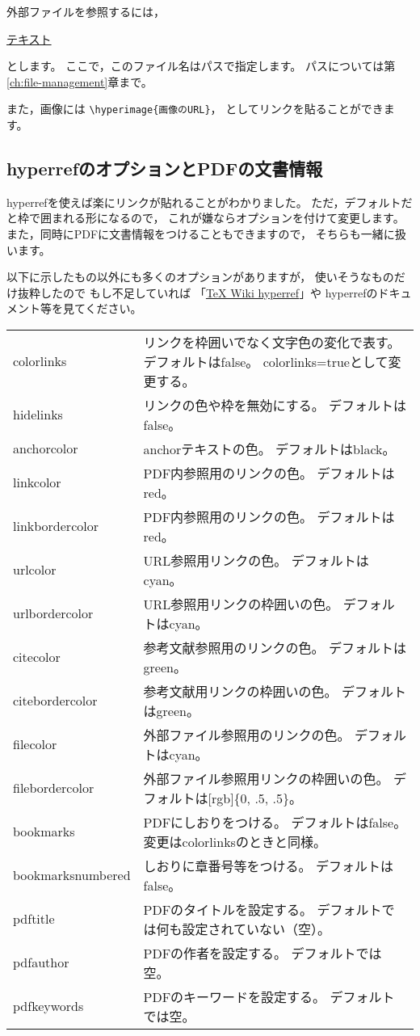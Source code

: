 外部ファイルを参照するには，
\begin{ITeX}
\href{ファイル名}{テキスト}
\end{ITeX}
とします。
ここで，このファイル名はパスで指定します。
パスについては第\ref{ch:file-management}章まで。

また，画像には
\verb|\hyperimage{画像のURL}|，
としてリンクを貼ることができます。


\subsection{hyperrefのオプションとPDFの文書情報}
hyperrefを使えば楽にリンクが貼れることがわかりました。
ただ，デフォルトだと枠で囲まれる形になるので，
これが嫌ならオプションを付けて変更します。
また，同時にPDFに文書情報をつけることもできますので，
そちらも一緒に扱います。

以下に示したもの以外にも多くのオプションがありますが，
使いそうなものだけ抜粋したので
もし不足していれば
「\href{https://texwiki.texjp.org/?hyperref}{TeX Wiki hyperref}」や
hyperrefのドキュメント等を見てください。

\begin{table}[H]
\label{tab:options-of-hyperef}
\begin{center}
\begin{longtable}{lp{}}
colorlinks &
	リンクを枠囲いでなく文字色の変化で表す。
	デフォルトはfalse。
	colorlinks=trueとして変更する。\\
hidelinks &
	リンクの色や枠を無効にする。
	デフォルトはfalse。\\
anchorcolor &
	anchorテキストの色。
	デフォルトはblack。\\
linkcolor &
	PDF内参照用のリンクの色。
	デフォルトはred。\\
linkbordercolor &
	PDF内参照用のリンクの色。
	デフォルトはred。\\
urlcolor &
	URL参照用リンクの色。
	デフォルトはcyan。\\
urlbordercolor &
	URL参照用リンクの枠囲いの色。
	デフォルトはcyan。\\
citecolor &
	参考文献参照用のリンクの色。
	デフォルトはgreen。\\
citebordercolor &
	参考文献用リンクの枠囲いの色。
	デフォルトはgreen。\\
filecolor &
	外部ファイル参照用のリンクの色。
	デフォルトはcyan。\\
filebordercolor &
	外部ファイル参照用リンクの枠囲いの色。
	デフォルトは[rgb]\{0, .5, .5\}。\\
bookmarks &	
	PDFにしおりをつける。
	デフォルトはfalse。
	変更はcolorlinksのときと同様。\\
bookmarksnumbered &
	しおりに章番号等をつける。
	デフォルトはfalse。\\
pdftitle &
	PDFのタイトルを設定する。
	デフォルトでは何も設定されていない（空）。\\
pdfauthor &
	PDFの作者を設定する。
	デフォルトでは空。\\
pdfkeywords &
	PDFのキーワードを設定する。
	デフォルトでは空。
\end{longtable}
\end{center}
\end{table}

